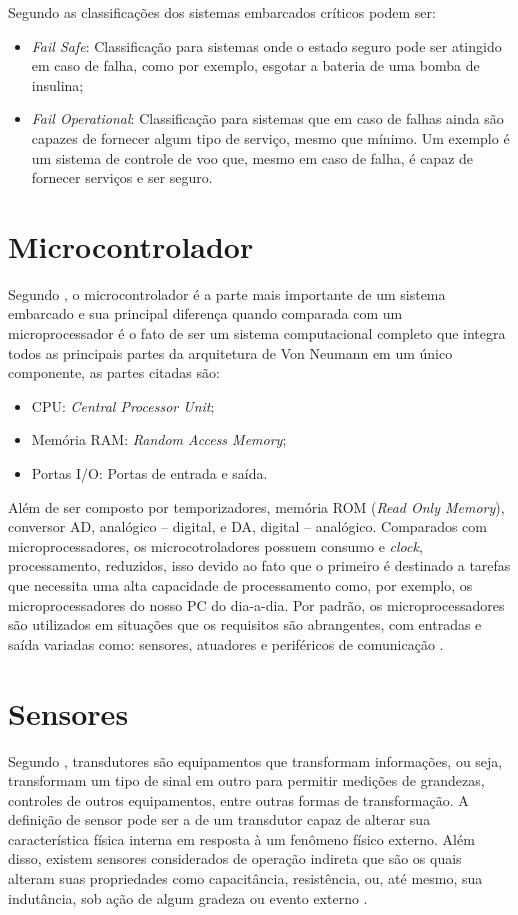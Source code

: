 Segundo \cite{kopetz2011real} as classificações dos sistemas embarcados críticos podem ser:
\begin{itemize}
\item \emph{Fail Safe}: Classificação para sistemas onde o estado seguro pode ser atingido em caso de falha, como por exemplo, esgotar a bateria de uma bomba de insulina;
\item \emph{Fail Operational}: Classificação para sistemas que em caso de falhas ainda são capazes de fornecer algum tipo de serviço, mesmo que mínimo. Um exemplo é um sistema de controle de voo que, mesmo em caso de falha, é capaz de fornecer serviços e ser seguro.
\end{itemize}

\section{Microcontrolador}
\label{sec:microcontrolador}

Segundo \cite{ganssle1999art}, o microcontrolador é a parte mais importante de um sistema embarcado e sua principal diferença quando comparada com um microprocessador é o fato de ser um sistema computacional completo que integra todos as principais partes da arquitetura de Von Neumann em um único componente, as partes citadas são:
\begin{itemize}
\item CPU: \emph{Central Processor Unit};
\item Memória RAM: \emph{Random Access Memory};
\item Portas I/O: Portas de entrada e saída.
\end{itemize}

Além de ser composto por temporizadores, memória ROM (\emph{Read Only Memory}), conversor AD, analógico – digital, e DA, digital – analógico.
Comparados com microprocessadores, os microcotroladores possuem consumo e \emph{clock}, processamento, reduzidos, isso devido ao fato que o primeiro é destinado a tarefas que necessita uma alta capacidade de processamento como, por exemplo, os microprocessadores do nosso PC do dia-a-dia. Por padrão, os microprocessadores são utilizados em situações que os requisitos são abrangentes, com entradas e saída variadas como: sensores, atuadores e periféricos de comunicação \cite{lee2011introduction}.



\section{Sensores}
Segundo \cite{transdutores2004usp}, transdutores são equipamentos que transformam informações, ou seja, transformam um tipo de sinal em outro para permitir medições de grandezas, controles de outros equipamentos, entre outras formas de transformação. A definição de sensor pode ser a de um transdutor capaz de alterar sua característica física interna em resposta à um fenômeno físico externo. Além disso, existem sensores considerados de operação indireta que são os quais alteram suas propriedades como capacitância, resistência, ou, até mesmo, sua indutância, sob ação de algum gradeza ou evento externo \cite{rosario2006principios}. 

